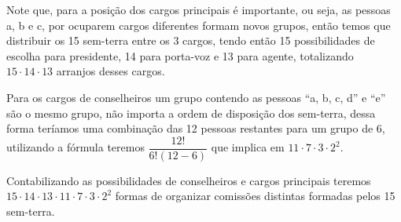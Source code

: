 Note que, para a posição dos cargos principais é importante, ou seja, as pessoas a, b e c, por ocuparem cargos diferentes formam novos grupos, então temos que distribuir os 15 sem-terra entre os 3 cargos, tendo então 15 possibilidades de escolha para presidente, 14 para porta-voz e 13 para agente, totalizando $15 \cdot 14 \cdot 13$ arranjos desses cargos.

Para os cargos de conselheiros um grupo contendo as pessoas ``a, b, c, d'' e ``e'' são o mesmo grupo, não importa a ordem de disposição dos sem-terra, dessa forma teríamos uma combinação das 12 pessoas restantes para um grupo de 6, utilizando a fórmula teremos $\dfrac{12!}{6!(12-6)}$ que implica em $11 \cdot 7 \cdot 3 \cdot 2^{2}$.

Contabilizando as possibilidades de conselheiros e cargos principais teremos  $15 \cdot 14 \cdot 13 \cdot 11 \cdot 7 \cdot 3 \cdot 2^{2}$ formas de organizar comissões distintas formadas pelos 15 sem-terra.
